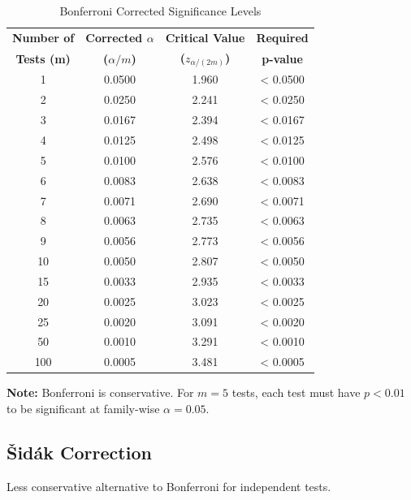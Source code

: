 \begin{table}[h]
\centering
\caption{Bonferroni Corrected Significance Levels}
\begin{tabular}{cccc}
\toprule
\textbf{Number of} & \textbf{Corrected $\alpha$} & \textbf{Critical Value} & \textbf{Required} \\
\textbf{Tests (m)} & \textbf{($\alpha/m$)} & \textbf{($z_{\alpha/(2m)}$)} & \textbf{p-value} \\
\midrule
1 & 0.0500 & 1.960 & < 0.0500 \\
2 & 0.0250 & 2.241 & < 0.0250 \\
3 & 0.0167 & 2.394 & < 0.0167 \\
4 & 0.0125 & 2.498 & < 0.0125 \\
5 & 0.0100 & 2.576 & < 0.0100 \\
6 & 0.0083 & 2.638 & < 0.0083 \\
7 & 0.0071 & 2.690 & < 0.0071 \\
8 & 0.0063 & 2.735 & < 0.0063 \\
9 & 0.0056 & 2.773 & < 0.0056 \\
10 & 0.0050 & 2.807 & < 0.0050 \\
15 & 0.0033 & 2.935 & < 0.0033 \\
20 & 0.0025 & 3.023 & < 0.0025 \\
25 & 0.0020 & 3.091 & < 0.0020 \\
50 & 0.0010 & 3.291 & < 0.0010 \\
100 & 0.0005 & 3.481 & < 0.0005 \\
\bottomrule
\end{tabular}
\end{table}

\textbf{Note:} Bonferroni is conservative. For $m = 5$ tests, each test must have $p < 0.01$ to be significant at family-wise $\alpha = 0.05$.

\subsection{Šidák Correction}

Less conservative alternative to Bonferroni for independent tests.

